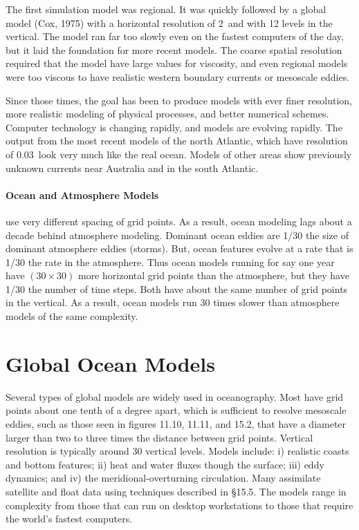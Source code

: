 The first simulation model was regional. It was quickly followed by a global model (Cox, 1975) with a horizontal resolution of 2\degrees\ and with 12 levels in the vertical. The model ran far too slowly even on the fastest computers of the day, but it laid the foundation for more recent models. The coarse spatial resolution required that the model have large values for viscosity, and even regional models were too viscous to have realistic western boundary currents or mesoscale eddies.

Since those times, the goal has been to produce models with ever finer resolution, more realistic modeling of physical processes, and better numerical schemes. Computer technology is changing rapidly, and models are evolving rapidly. The output from the most recent models of the north Atlantic, which have resolution of 0.03\degrees\ look very much like the real ocean. Models of other areas show previously unknown currents near Australia and in the south Atlantic. 

\paragraph{Ocean and Atmosphere Models} use very different spacing of grid points. As a result, ocean modeling lags about a decade behind atmosphere modeling. Dominant ocean eddies are 1/30 the size of dominant atmosphere eddies (storms). But, ocean features evolve at a rate that is 1/30 the rate in the atmosphere. Thus ocean models running for say one year have $(30 \times 30 )$ more horizontal grid points than the atmosphere, but they have 1/30 the number of time steps. Both have about the same number of grid points in the vertical. As a result, ocean models run 30 times slower than atmosphere models of the same complexity.

\section{Global Ocean Models}

Several types of global models are widely used in oceanography. Most have grid points about one tenth of a degree apart, which is sufficient to resolve mesoscale eddies, such as those seen in figures 11.10, 11.11, and 15.2, that have a diameter larger than two to three times the distance between grid points. Vertical resolution is typically around 30 vertical levels. Models include: i) realistic coasts and bottom features; ii) heat and water fluxes though the surface; iii) eddy dynamics; and iv) the meridional-overturning circulation. Many assimilate satellite and float data using techniques described in \S 15.5. The models range in complexity from those that can run on desktop workstations to those that require the world's fastest computers.

